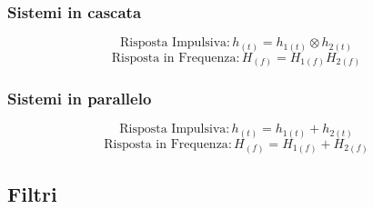         \subsubsection{Sistemi in cascata}
            \[
                \text{Risposta Impulsiva}: h_{(t)} = h_{1(t)}\otimes h_{2(t)}
            \]
            \[
                \text{Risposta in Frequenza}: H_{(f)} = H_{1(f)} H_{2(f)}
            \]
        \subsubsection{Sistemi in parallelo}
            \[
                \text{Risposta Impulsiva}: h_{(t)} = h_{1(t)}+h_{2(t)}
            \]
            \[
                \text{Risposta in Frequenza}: H_{(f)} = H_{1(f)} + H_{2(f)}
            \]
    \subsection{Filtri}
